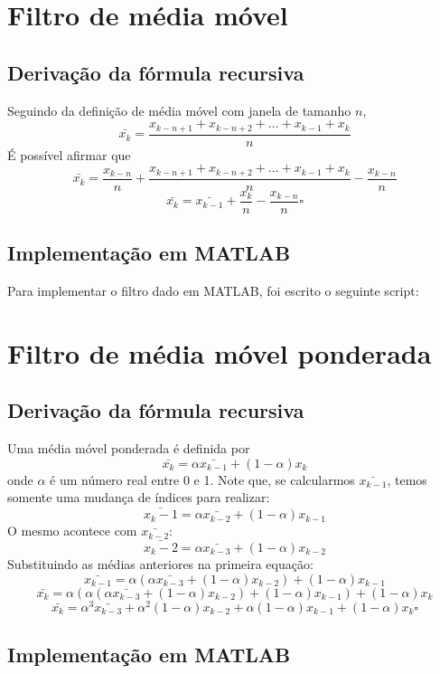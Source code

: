 \documentclass[12pt, a4paper, twoside]{article}
\begin{document}
\section{Filtro de média móvel}

\subsection{Derivação da fórmula recursiva}

Seguindo da definição de média móvel com janela de tamanho $n$,
$$\bar{x_k}=\frac{x_{k-n+1}+x_{k-n+2}+\ldots+x_{k-1}+x_{k}}{n}$$
É possível afirmar que
$$\bar{x_k}=\frac{x_{k-n}}{n} + \frac{x_{k-n+1}+x_{k-n+2}+\ldots+x_{k-1}+x_{k}}{n} -\frac{x_{k-n}}{n}$$
$$\bar{x_k}=\bar{x_{k-1}} + \frac{x_k}{n} - \frac{x_{k-n}}{n}\square$$


\subsection{Implementação em MATLAB}

Para implementar o filtro dado em MATLAB, foi escrito o seguinte script:


\section{Filtro de média móvel ponderada}

\subsection{Derivação da fórmula recursiva}

Uma média móvel ponderada é definida por
$$\bar{x_k}=\alpha\bar{x_{k-1}}+(1-\alpha)x_k$$
onde $\alpha$ é um número real entre 0 e 1. Note que, se calcularmos $\bar{x_{k-1}}$, temos somente uma mudança de índices para realizar:
$$\bar{x_k-1}=\alpha\bar{x_{k-2}}+(1-\alpha)x_{k-1}$$
O mesmo acontece com $\bar{x_{k-2}}$:
$$\bar{x_k-2}=\alpha\bar{x_{k-3}}+(1-\alpha)x_{k-2}$$
Substituindo as médias anteriores na primeira equação:
$$\bar{x_{k-1}}=\alpha(\alpha\bar{x_{k-3}}+(1-\alpha)x_{k-2})+(1-\alpha)x_{k-1}$$
$$\bar{x_{k}}=\alpha(\alpha(\alpha\bar{x_{k-3}}+(1-\alpha)x_{k-2})+(1-\alpha)x_{k-1})+(1-\alpha)x_k$$
$$\bar{x_k}=\alpha^3\bar{x_{k-3}}+\alpha^2(1-\alpha)x_{k-2}+\alpha(1-\alpha)x_{k-1}+(1-\alpha)x_k\square$$

\subsection{Implementação em MATLAB}
\end{document}
